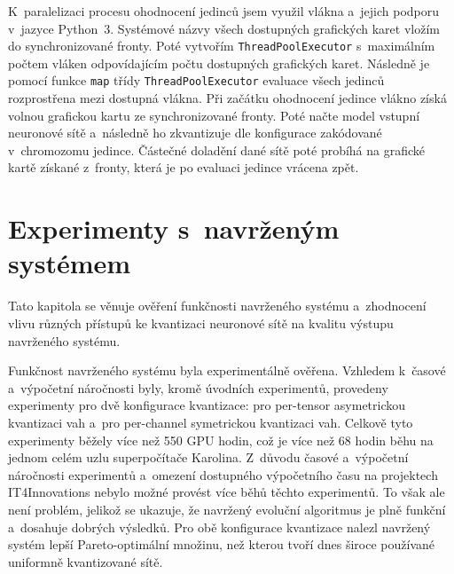 K~paralelizaci procesu ohodnocení jedinců jsem využil vlákna a~jejich podporu v~jazyce Python~3. Systémové názvy všech dostupných grafických karet vložím do synchronizované fronty. Poté vytvořím \texttt{ThreadPoolExecutor} s~maximálním počtem vláken odpovídajícím počtu dostupných grafických karet. Následně je pomocí funkce \verb|map| třídy \texttt{ThreadPoolExecu\-tor} evaluace všech jedinců rozprostřena mezi dostupná vlákna. Při začátku ohodnocení jedince vlákno získá volnou grafickou kartu ze synchronizované fronty. Poté načte model vstupní neuronové sítě a~následně ho zkvantizuje dle konfigurace zakódované v~chromozomu jedince. Částečné doladění dané sítě poté probíhá na grafické kartě získané z~fronty, která je po evaluaci jedince vrácena zpět.


\chapter{Experimenty s~navrženým systémem}
\label{chaper:experiments}

Tato kapitola se věnuje ověření funkčnosti navrženého systému a~zhodnocení vlivu různých přístupů ke kvantizaci neuronové sítě na kvalitu výstupu navrženého systému.

Funkčnost navrženého systému byla experimentálně ověřena. Vzhledem k~časové a~výpočetní náročnosti byly, kromě úvodních experimentů, provedeny experimenty pro dvě konfigurace kvantizace: pro per-tensor asymetrickou kvantizaci vah a~pro per-channel symetrickou kvantizaci vah. Celkově tyto experimenty běžely více než 550 GPU hodin, což je více než 68 hodin běhu na jednom celém uzlu superpočítače Karolina. Z~důvodu časové a~výpočetní náročnosti experimentů a~omezení dostupného výpočetního času na projektech IT4Innovations nebylo možné provést více běhů těchto experimentů. To však ale není problém, jelikož se ukazuje, že navržený evoluční algoritmus je plně funkční a~dosahuje dobrých výsledků. Pro obě konfigurace kvantizace nalezl navržený systém lepší Pareto-optimální množinu, než kterou tvoří dnes široce používané uniformně kvantizované sítě.


